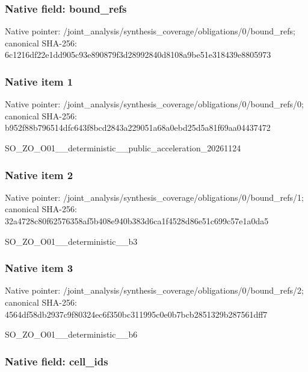 \documentclass[10pt,a4paper]{article}
\begin{document}
\subsubsection{Native field: bound\_refs}


Native pointer: /joint\_analysis/synthesi\allowbreak{}s\_coverage/obligations/0\allowbreak{}/bound\_refs; canonical SHA-256: 6c1216df22e1dd905c93e890\allowbreak{}879f3d28992840d8108a9be5\allowbreak{}1e318439e8805973



\subsubsection{Native item 1}


Native pointer: /joint\_analysis/synthesi\allowbreak{}s\_coverage/obligations/0\allowbreak{}/bound\_refs/0; canonical SHA-256: b952f88b796514dfc643f8bc\allowbreak{}d2843a229051a68a0ebd25d5\allowbreak{}a81f69aa04437472


SO\_ZO\_O01\_\_deterministic\allowbreak{}\_\_public\_acceleration\_20\allowbreak{}261124


\subsubsection{Native item 2}


Native pointer: /joint\_analysis/synthesi\allowbreak{}s\_coverage/obligations/0\allowbreak{}/bound\_refs/1; canonical SHA-256: 32a4728c80f62576358af5b4\allowbreak{}08e940b383d6ca1f4528d86e\allowbreak{}51c699c57e1a0da5


SO\_ZO\_O01\_\_deterministic\_\_b3


\subsubsection{Native item 3}


Native pointer: /joint\_analysis/synthesi\allowbreak{}s\_coverage/obligations/0\allowbreak{}/bound\_refs/2; canonical SHA-256: 4564df58db2937c9f80324ec\allowbreak{}6f350bc311995c0e0b7bcb28\allowbreak{}51329b287561dff7


SO\_ZO\_O01\_\_deterministic\_\_b6


\subsubsection{Native field: cell\_ids}
\end{document}
